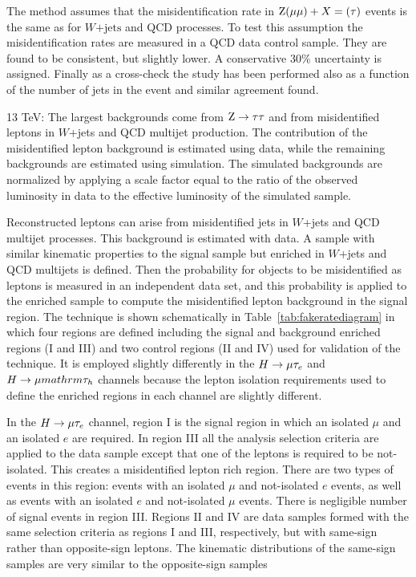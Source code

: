 \documentclass[oneside, letterpaper, oldfontcommands]{memoir}
\begin{document}
{{{The method assumes that the misidentification rate in $\mathrm{Z}(\mu \mu) +X=(\tau)$ events is the same as
for $W\mathrm{+jets}$ and QCD processes. To test this assumption the misidentification rates are measured in a QCD data control
sample. They are found to be consistent, but slightly lower. A conservative 30\% uncertainty is assigned.
Finally as a cross-check the study has been performed also as a function of the number of jets in the event and similar agreement found.


13 TeV:
The largest backgrounds come from $\mathrm{Z} \rightarrow \mathrm{\tau} \mathrm{\tau}$ and from misidentified leptons in $W$+jets and QCD multijet production. The contribution of the misidentified lepton background is estimated using data, while the remaining backgrounds are estimated using simulation.
The simulated backgrounds are normalized by applying a scale factor equal to the ratio of the observed luminosity in data to the effective luminosity of the simulated sample.


Reconstructed leptons can arise from misidentified jets in $W$+jets and QCD multijet processes.
This background is estimated with data. A sample with similar kinematic
properties to the signal sample but enriched in $W$+jets and QCD multijets
is defined. Then the probability for objects to be misidentified as leptons is measured
in an independent data set, and this probability is applied to the enriched sample to
compute the misidentified lepton background in the signal region.
The technique is shown schematically in Table~\ref{tab:fakeratediagram} in which four regions
are defined including the signal and background enriched regions (I and III) and two control regions (II and IV) used for validation
of the technique. It is employed slightly differently in the
$H \rightarrow \mu \mathrm{\tau}_{e}$ and $H \rightarrow \mu mathrm{\tau_{h}}$ channels because
the lepton isolation requirements used to define the enriched regions in each channel
are slightly different.

In the $H \rightarrow \mu \mathrm{\tau}_{e}$ channel, region I is the signal region in which an isolated $\mu$ and an isolated $e$ are required.
In region III all the analysis selection criteria are applied to the data sample except that
one of the leptons is required to be not-isolated. This creates a misidentified lepton rich region. There are two types of events in this region: events with an
isolated $\mu$ and not-isolated $e$ events, as well as events with an isolated $e$ and not-isolated $\mu$ events. There is negligible number of signal events in region III. Regions II and IV are data samples formed with the same selection criteria as regions I and III, respectively, but with same-sign rather than opposite-sign leptons. The kinematic distributions of the same-sign samples are very similar to the opposite-sign samples

}}}
\end{document}
